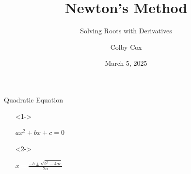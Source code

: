 \documentclass[aspectratio=169,xcolor=dvipsnames]{beamer}
\title{Newton's Method}
\subtitle{Solving Roots with Derivatives}
\author{Colby Cox}
\institute
{
    University of Central Arkansas %
}
\date{March 5, 2025} %
\begin{document}
\begin{frame}
    \titlepage
\end{frame}




\begin{frame}{Quadratic Equation}
    \begin{itemize}
        \item[] <1->
        \begin{center}
            $ax^2 + bx + c = 0$
        \end{center}
        \item[] <2->
        \begin{center}
            $x = \frac{-b\pm \sqrt{b^2 - 4ac}}{2a}$
        \end{center}
    \end{itemize}
\end{frame}
\end{document}
